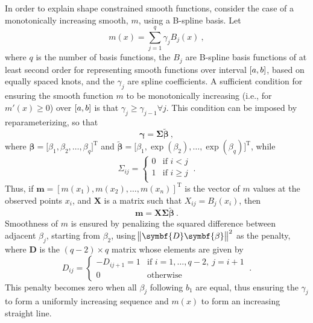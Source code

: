 In order to explain shape constrained smooth functions, consider the case of a monotonically increasing smooth, \(m\), using a B-spline basis.  Let
\begin{equation}
  \label{eq:SCAMMonotonicallyIncreasingSmooth}
  m(x) = \sum_{j = 1}^q \gamma_j B_j(x)~,
\end{equation}
where \(q\) is the number of basis functions, the \(B_j\) are B-spline basis functions of at least second order for representing smooth functions over interval \(\interval{a}{b}\), based on equally spaced knots, and the \(\gamma_j\) are spline coefficients.  A sufficient condition for ensuring the smooth function \(m\) to be monotonically increasing (i.e., for \(m'(x) \geq 0\)) over \(\interval{a}{b}\) is that \(\gamma_j \geq \gamma_{j -1} \forall j\).  This condition can be imposed by reparameterizing, so that
\begin{equation}
  \label{eq:SCAMReparameterizedGamma}
  \symbf{\gamma} = \symbf{\Sigma} \tilde{\symbf{\beta}}~,
\end{equation}
where \(\symbf{\beta} = \bigl[\beta_1, \beta_2, \ldots, \beta_q\bigr]^{\text{T}}\) and \(\tilde{\symbf{\beta}} = \bigl[\beta_1, \exp(\beta_2), \ldots, \exp(\beta_q)\bigr]^{\text{T}}\), while
\begin{equation}
  \label{eq:SCAMSigmaMontoneIncreasing}
  \Sigma_{i j} =
  \begin{cases}
    0 &\text{if } i < j \\
    1 &\text{if } i \geq j \\
  \end{cases}~.
\end{equation}
Thus, if \(\symbf{m} = [m(x_1), m(x_2), \ldots, m(x_n)]^{\text{T}}\) is the vector of \(m\) values at the observed points \(x_i\), and \(\symbf{X}\) is a matrix such that \(X_{i j} = B_j(x_i)\), then
\begin{equation}
  \label{eq:SCAMConstrainedSmootherVector}
  \symbf{m} = \symbf{X} \symbf{\Sigma} \tilde{\symbf{\beta}}~.
\end{equation}
Smoothness of \(m\) is ensured by penalizing the squared difference between adjacent \(\beta_j\), starting from \(\beta_2\), using \(\norm{\symbf{D} \symbf{\beta}}^2\) as the penalty, where \(\symbf{D}\) is the \((q-2) \times q\) matrix
whose elements are given by
\begin{equation}
  \label{eq:SCAMDMonotoneIncreasing}
  D_{i j} = 
  \begin{cases}
    - D_{i j + 1} = 1 &\text{if } i = 1, \ldots, q - 2,~ j = i + 1 \\
    0 &\text{otherwise}
  \end{cases}~.
\end{equation}
This penalty becomes zero when all \(\beta_j\) following \(b_1\) are equal, thus ensuring the \(\gamma_j\) to form a uniformly increasing sequence and \(m(x)\) to form an increasing straight line.

